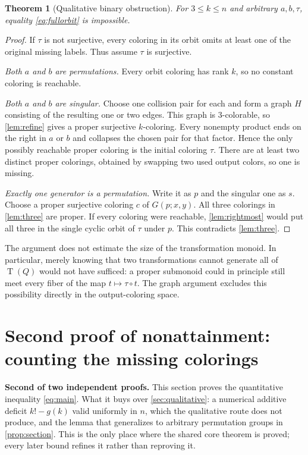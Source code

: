 \documentclass[11pt,a4paper]{article}
\numberwithin{equation}{section}
\newtheorem{theorem}{Theorem}[section]
\theoremstyle{definition}
\theoremstyle{remark}
\newcommand{\TQ}{\operatorname{T}(Q)}
\begin{document}
\begin{theorem}[Qualitative binary obstruction]\label{thm:qualitative}
For $3\le k\le n$ and arbitrary $a,b,\tau$, equality
\eqref{eq:fullorbit} is impossible.
\end{theorem}
\begin{proof}
If $\tau$ is not surjective, every coloring in its orbit omits at least one
of the original missing labels. Thus assume $\tau$ is surjective.

\emph{Both $a$ and $b$ are permutations.} Every orbit coloring has rank $k$,
so no constant coloring is reachable.

\emph{Both $a$ and $b$ are singular.} Choose one collision pair for each and
form a graph $H$ consisting of the resulting one or two edges. This graph is
$3$-colorable, so \cref{lem:refine} gives a proper surjective $k$-coloring.
Every nonempty product ends on the right in $a$ or $b$ and collapses the
chosen pair for that factor. Hence the only possibly reachable proper
coloring is the initial coloring $\tau$. There are at least two distinct
proper colorings, obtained by swapping two used output colors, so one is
missing.

\emph{Exactly one generator is a permutation.} Write it as $p$ and the
singular one as $s$. Choose a proper surjective coloring $c$ of
$G(p;x,y)$. All three colorings in \cref{lem:three} are proper. If every
coloring were reachable, \cref{lem:rightmost} would put all three in the
single cyclic orbit of $\tau$ under $p$. This contradicts \cref{lem:three}.
\end{proof}

The argument does not estimate the size of the transformation monoid. In
particular, merely knowing that two transformations cannot generate all of
$\TQ$ would not have sufficed: a proper submonoid could in principle still
meet every fiber of the map $t\mapsto\tau\circ t$. The graph argument
excludes this possibility directly in the output-coloring space.

\section{Second proof of nonattainment: counting the missing
colorings}\label{sec:quantitative}

\begin{resultbox}
\textbf{Second of two independent proofs.} This section proves the
quantitative inequality \eqref{eq:main}. What it buys over
\cref{sec:qualitative}: a numerical additive deficit $k!-g(k)$ valid
uniformly in $n$, which the qualitative route does not produce, and the
lemma that generalizes to arbitrary permutation groups in
\cref{prop:section}. This is the only place where the shared core theorem is
proved; every later bound refines it rather than reproving it.
\end{resultbox}
\end{document}
